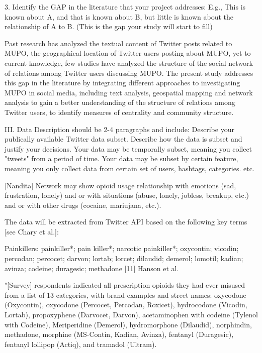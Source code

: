 \documentclass[sigconf]{acmart}
\begin{document}
3. Identify the GAP in the literature that your project addresses:
E.g., This is known about A, and that is known about B, but little is known about the relationship of A to B.  (This is the gap your study will start to fill)

Past research has analyzed the textual content of Twitter posts related to MUPO, the geographical location of Twitter users posting about MUPO, yet to current knowledge, few studies have analyzed the structure of the social network of relations among Twitter users discussing MUPO. The present study addresses this gap in the literature by integrating different approaches to investigating MUPO in social media, including text analysis, geospatial mapping and network analysis to gain a better understanding of the structure of relations among Twitter users, to identify measures of centrality and community structure. 

III. Data Description should be 2-4 paragraphs and include:
Describe your publically available Twitter data subset.
Describe how the data is subset and justify your decisions. Your data may be temporally subset, meaning you collect "tweets" from a period of time. Your data may be subset by certain feature, meaning you only collect data from certain set of users, hashtags, categories. etc.

[Nandita] Network may show opioid usage relationship with emotions (sad, frustration, lonely) and or with situations (abuse, lonely, jobless, breakup, etc.) and or with other drugs (cocaine, mariujana, etc.).

The data will be extracted from Twitter API based on the following key terms [see Chary et al.]: 

Painkillers: painkiller*; pain killer*; narcotic painkiller*; oxycontin; vicodin; percodan; percocet; darvon; lortab; lorcet; dilaudid; demerol; lomotil; kadian; avinza; codeine; duragesic; methadone
[11] Hanson et al.


"[Survey] respondents indicated all prescription opioids they had ever misused from a list of 13 categories, with brand examples and street names: oxycodone (Oxycontin), oxycodone (Percocet, Percodan, Roxicet), hydrocodone (Vicodin, Lortab), propoxyphene (Darvocet, Darvon), acetaminophen with codeine (Tylenol with Codeine), Meriperidine (Demerol), hydromorphone (Dilaudid), norphindin, methadone, morphine (MS-Contin, Kadian, Avinza), fentanyl (Duragesic), fentanyl lollipop (Actiq), and tramadol (Ultram). 

\end{document}
